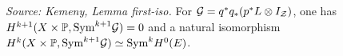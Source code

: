 \begin{lemma}
  \label{lem:kemeny_first_iso}
  \textit{Source: Kemeny, Lemma first-iso.}
  For \(\mathcal{G}=q^*q_*(p^*L\otimes I_{\mathcal{Z}})\), one has
  \(H^{k+1}(X\times\mathbb{P},\mathrm{Sym}^{k+1}\mathcal{G})=0\) and a natural isomorphism
  \(H^k(X\times\mathbb{P},\mathrm{Sym}^{k+1}\mathcal{G})\simeq \mathrm{Sym}^kH^0(E)\).
\end{lemma}

